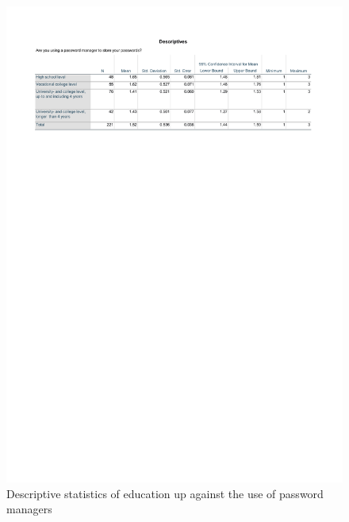 \begin{figure}[!h]
    \centering
    \includegraphics[scale=0.7]{figures/tables/anova_education_desc.pdf}
    \caption{Descriptive statistics of education up against the use of password managers}
    \label{fig:anova_education_desc}
\end{figure}

